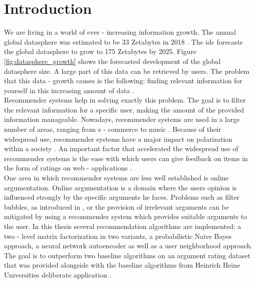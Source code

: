 \listoffigures
\listoftables
{}
\printglossary[type=\acronymtype, nonumberlist, style=alttree, nogroupskip=true]

\section{Introduction}
\label{chap:intro}
We are living in a world of ever - increasing information growth. The annual global datasphere was estimated to be 33 Zetabytes in 2018 \cite{rydning2018digitization}. The \acrfull{idc} forecasts the global datasphere to grow to 175 Zetabytes by 2025. Figure \ref{fig:datasphere_growth} shows the forecasted development of the global datasphere size. A large part of this data can be retrieved by users. The problem that this data - growth causes is the following: finding relevant information for yourself in this increasing amount of data \cite{burke2011recommender}.\\Recommender systems help in solving exactly this problem. The goal is to filter the relevant information for a specific user, making the amount of the provided information manageable.
Nowadays, recommender systems are used in a large number of areas, ranging from e - commerce to music \cite{kumar2021recommender}. Because of their widespread use, recommender systems have a major impact on polarization within a society \cite{stray2021designing}.
An important factor that accelerated the widespread use of recommender systems is the ease with which users can give feedback on items in the form of ratings on web - applications \cite{aggarwal2016recommender}.\\
One area in which recommender systems are less well established is online argumentation. Online argumentation is a domain where the users opinion is influenced strongly by the specific arguments he faces. Problems such as filter bubbles, as introduced in \cite{pariser2011filter}, or the provision of irrelevant arguments can be mitigated by using a recommender system
which provides suitable arguments to the user.
In this thesis several recommendation algorithms are implemented: a two - level matrix factorization in two variants, a probabilistic Naive Bayes approach, a neural network autoencoder as well as a user neighborhood approach. The goal is to outperform two baseline algorithms on an argument rating dataset that was provided alongside with the baseline algorithms from Heinrich Heine Universities deliberate application \cite{brenneis2020deliberate}.\\
